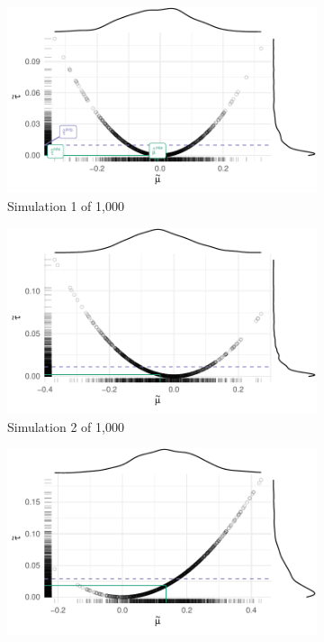\documentclass[11pt]{article}
\begin{document}
\begin{figure}
\begin{subfigure}{.5\textwidth}
  \centering
  \includegraphics[width=.85\linewidth]{figs/intuition-1.pdf}
  \caption{Simulation 1 of 1,000}
  \label{fig:int1}
\end{subfigure}%
\begin{subfigure}{.5\textwidth}
  \centering
  \includegraphics[width=.85\linewidth]{figs/intuition-2.pdf}
  \caption{Simulation 2 of 1,000}
  \label{fig:int2}
\end{subfigure}
\begin{subfigure}{.5\textwidth}
  \centering
  \includegraphics[width=.85\linewidth]{figs/intuition-3.pdf}

\end{subfigure}
\end{figure}
\end{document}
